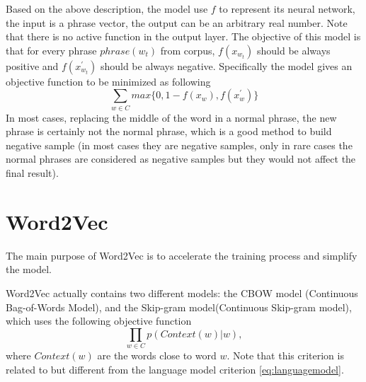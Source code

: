Based on the above description, the model use $f$ to represent its neural network, the input is a phrase vector, the output can be an arbitrary real number. Note that there is no active function in the output layer. The objective of this model is that for every phrase $phrase(w_t)$ from corpus,  $f(x_{w_t})$ should be always positive and $f(x^\prime_{w_t})$ should be always negative. Specifically the model gives an objective function to be minimized as following
\begin{equation}\label{eq:skipgram}
\sum_{w\in C}max\{0,1-f(x_{w}),f(x^\prime_{w})\}
\end{equation}
In most cases, replacing the middle of the word in a normal phrase, the new phrase is certainly not the normal phrase, which is a good method to build negative sample (in most cases they are negative samples, only in rare cases the normal phrases are considered as negative samples but they would not affect the final result). 


\section{Word2Vec}

The main purpose of Word2Vec is to accelerate the training process and simplify the model. 

Word2Vec actually contains two different models: the CBOW model (Continuous Bag-of-Words Model),   and the Skip-gram model(Continuous Skip-gram model), which uses the following objective function 
\begin{equation}
\prod_{w\in C}p(Context(w)|w),
\end{equation}
where $Context(w)$ are the words close to word $w$. Note that this criterion is related to but different from the language model criterion \ref{eq:languagemodel}.


